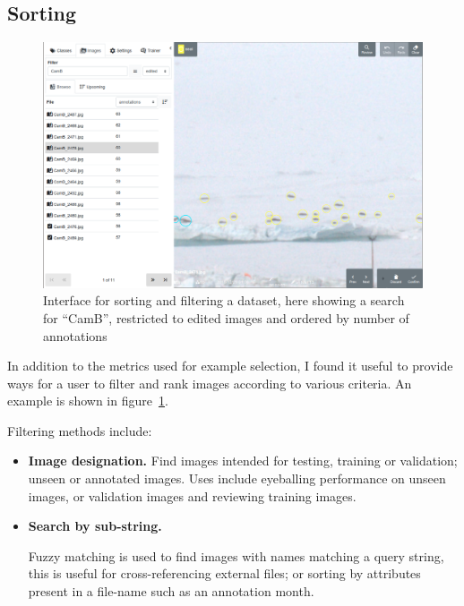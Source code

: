 \subsection {Sorting}

\begin{figure}[!h]
  \centering
  \includegraphics[width=1.0\linewidth]{figures/annotation/screenshots/sort_filter.png}
  \caption{Interface for sorting and filtering a dataset, here showing a search for ``CamB'', restricted to edited images and ordered by number of annotations}  
  \label{fig:sorting_filtering}
\end{figure}

In addition to the metrics used for example selection, I found it useful to provide ways for a user to filter and rank images according to various criteria. An example is shown in figure~\ref{fig:sorting_filtering}.

Filtering methods include:

\begin{itemize}
    \item {\bf Image designation.}
Find images intended for testing, training or validation; unseen or annotated images. Uses include eyeballing performance on unseen images, or validation images and reviewing training images.

\item {\bf Search by sub-string.}

Fuzzy matching is used to find images with names matching a query string, this is useful for cross-referencing external files; or sorting by attributes present in a file-name such as an annotation month.

\end{itemize}


